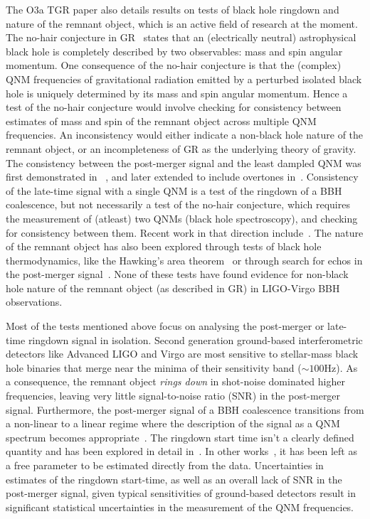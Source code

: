 \documentclass[twocolumn,prd,superscriptaddress,amsfonts,amssymb,amsmath,preprintnumbers]{revtex4-1}
\begin{document}
\par
The O3a TGR paper also details results on tests of black hole ringdown and nature of the remnant object, which is an active field of research at the moment. The no-hair conjecture in GR~\citep{} states that an (electrically neutral) astrophysical black hole is completely described by two observables: mass and spin angular momentum. One consequence of the no-hair conjecture is that the (complex) QNM frequencies of gravitational radiation emitted by a perturbed isolated black hole is uniquely determined by its mass and spin angular momentum. Hence a test of the no-hair conjecture would involve checking for consistency between estimates of mass and spin of the remnant object across multiple QNM frequencies. An inconsistency would either indicate a non-black hole nature of the remnant object, or an incompleteness of GR as the underlying theory of gravity. The consistency between the post-merger signal and the least dampled QNM was first demonstrated in ~\citep{LSC_2016grtests}, and later extended to include overtones in~\citep{Giesler:2019uxc,Isi:2019aib,Bhagwat:2019dtm,Forteza:2020hbw}. Consistency of the late-time signal with a single QNM is a test of the ringdown of a BBH coalescence, but not necessarily a test of the no-hair conjecture, which requires the measurement of (atleast) two QNMs (black hole spectroscopy), and checking for consistency between them. Recent work in that direction include~\citep{Carullo:2018gah,Carullo:2019flw,Bhagwat:2019bwv}. The nature of the remnant object has also been explored through tests of black hole thermodynamics, like the Hawking's area theorem~\citep{Cabero:2017avf} or through search for echos in the post-merger signal~\citep{Nielsen:2018lkf,Tsang:2019zra,Lo:2018sep,Abedi:2018npz,Abedi:2020sgg,Testa:2018bzd}. None of these tests have found evidence for non-black hole nature of the remnant object (as described in GR) in LIGO-Virgo BBH observations.
\par
Most of the tests mentioned above focus on analysing the post-merger or late-time ringdown signal in isolation. Second generation ground-based interferometric detectors like Advanced LIGO and Virgo are most sensitive to stellar-mass black hole binaries that merge near the minima of their sensitivity band ($\sim 100$Hz). As a consequence, the remnant object \textit{rings down} in shot-noise dominated higher frequencies, leaving very little signal-to-noise ratio (SNR) in the post-merger signal. Furthermore, the post-merger signal of a BBH coalescence transitions from a non-linear to a linear regime where the description of the signal as a QNM spectrum becomes appropriate~\citep{}. The ringdown start time isn't a clearly defined quantity and has been explored in detail in~\citep{Bhagwat:2017tkm}. In other works~\citep{Carullo:2018gah,Carullo:2019flw}, it has been left as a free parameter to be estimated directly from the data. Uncertainties in estimates of the ringdown start-time, as well as an overall lack of SNR in the post-merger signal, given typical sensitivities of ground-based detectors result in significant statistical uncertainties in the measurement of the QNM frequencies.
\end{document}
